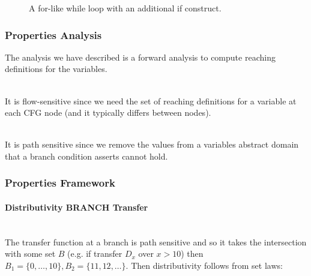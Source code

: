 \documentclass[a4paper]{article}
\newcommand{\DomRel}[2]{#1\;\underline{\texttt{>>}}\;#2}
\newcommand{\NL}[0]{ \hfill\\\noindent }
\begin{document}




\begin{figure}[ht!]
	\centering	
	\scalebox{.5}{}
	\caption{ A for-like while loop with an additional if construct. }
	\label{forwhileif}
\end{figure}
\subsubsection{Properties Analysis}
The analysis we have described is a forward analysis to compute reaching definitions for the variables. 

\NL
It is flow-sensitive since we need the set of reaching definitions for a variable at each CFG node (and it typically differs between nodes).

\NL
It is path sensitive since we remove the values from a variables abstract domain that a branch condition asserts cannot hold.

\subsubsection{Properties Framework}
\paragraph{Distributivity BRANCH Transfer}\NL
The transfer function at a branch is path sensitive and so it takes the intersection with some set $B$ (e.g. if transfer $D_x$ over $x > 10$) then $B_1 = \{0,\ldots,10\}, B_2 = \{11, 12, \ldots\}$. Then distributivity follows from set laws: 
\end{document}
